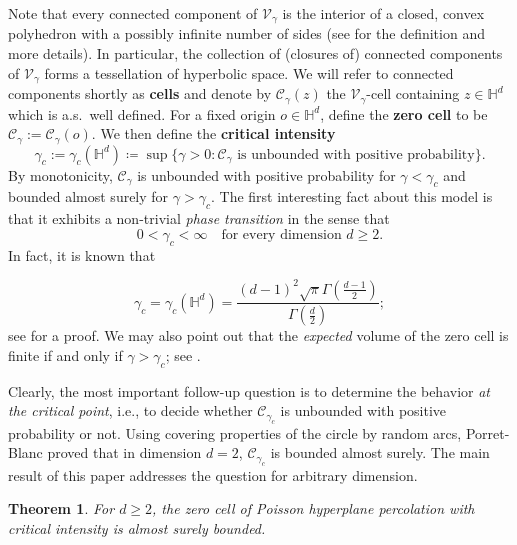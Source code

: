 \documentclass[12pt,a4paper]{article}
\newtheorem{theorem}[proposition]{Theorem}
\theoremstyle{definition}
\renewcommand{\H}{\mathbb{H}}
\begin{document}
Note that every connected component of $\mathcal V_\gamma$ is the interior of a closed, convex polyhedron with a possibly infinite number of sides (see \cite[Section 6.3]{Ra19} for the definition and more details).
In particular, the collection of (closures of) connected components of $\mathcal V_\gamma$ forms a tessellation of hyperbolic space.
We will refer to connected components shortly as {\bf cells} and denote by $\mathcal C_\gamma(z)$ the $\mathcal V_\gamma$-cell containing $z\in\H^d$ which is a.s.\ well defined. For a fixed origin $o\in\mathbb H^d$, define the {\bf zero cell} to be $\mathcal C_\gamma:=\mathcal C_\gamma(o)$. We then define the {\bf critical intensity}
\begin{equation} \label{def-critical intensity}
\gamma_c := \gamma_c(\mathbb H^d) \coloneqq \sup \big\{ \gamma>0 \colon \mathcal C_\gamma \, \,\text{is unbounded with positive probability} \big\}.
\end{equation}
By monotonicity, $\mathcal C_\gamma$ is unbounded with positive probability for $\gamma<\gamma_c$ and bounded almost surely for $\gamma>\gamma_c$. The first interesting fact about this model is that it exhibits a non-trivial {\em phase transition} in the sense that
\begin{equation}\label{eq:value_critical}
0<\gamma_c<\infty \quad \text{for every dimension} \, \, d\geq2.
\end{equation}
In fact, it is known that 

\begin{equation*}
    \gamma_c = \gamma_c(\mathbb H^d) = \frac{(d-1)^2\sqrt{\pi}\Gamma(\frac{d-1}{2})}{\Gamma(\frac d 2)};
\end{equation*}
see \cite[Theorem 3.3]{GKT} for a proof.
We may also point out that the {\em expected} volume of the zero cell is finite if and only if \(\gamma > \gamma_c\); see \cite[Theorem 7.1]{BHT25}.

Clearly, the most important follow-up question is to determine the behavior {\em at the critical point}, i.e., to decide whether $\mathcal C_{\gamma_c}$ is unbounded with positive probability or not. Using covering properties of the circle by random arcs, Porret-Blanc \cite{P07} proved that in dimension $d=2$, $\mathcal C_{\gamma_c}$ is bounded almost surely. The main result of this paper addresses the question for arbitrary dimension.

\begin{theorem} \label{thm:main}
    For \(d \geq 2\), the zero cell of Poisson hyperplane percolation with critical intensity is almost surely bounded.
\end{theorem}
\end{document}
